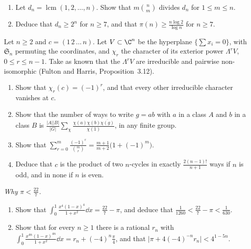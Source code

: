 \begin{exercise}[$\star\star$]\label{pb:nair}
\begin{enumerate}[label=(\alph*)]
\item Let $d_n=\operatorname{lcm}(1,2,\dots,n)$. Show that $m\binom nm$ divides $d_n$ for $1\le m\le n$.
\item Deduce that $d_n\ge2^n$ for $n\ge7$, and that $\pi(n)\ge\frac{n\log2}{\log n}$ for $n\ge7$.
\end{enumerate}
\end{exercise}

\begin{exercise}[$\star\star\star$]\label{pb:ncycles}
Let $n\ge2$ and $c=(1\,2\,\dots\,n)$. Let $V\subset\C^n$ be the hyperplane $\{\sum x_i=0\}$, with $\mathfrak S_n$ permuting
the coordinates, and $\chi_r$ the character of its exterior power $\Lambda^rV$, $0\le r\le n-1$. Take as known that the
$\Lambda^rV$ are irreducible and pairwise non-isomorphic (Fulton and Harris, Proposition~3.12).
\begin{enumerate}[label=(\alph*)]
\item Show that $\chi_r(c)=(-1)^r$, and that every other irreducible character vanishes at $c$.
\item Show that the number of ways to write $g=ab$ with $a$ in a class $A$ and $b$ in a class $B$ is
$\frac{|A||B|}{|G|}\sum_\chi\frac{\chi(a)\chi(b)\overline{\chi(g)}}{\chi(1)}$, in any finite group.
\item Show that $\sum_{r=0}^m\frac{(-1)^r}{\binom mr}=\frac{m+1}{m+2}\bigl(1+(-1)^m\bigr)$.
\item Deduce that $c$ is the product of two $n$-cycles in exactly $\frac{2(n-1)!}{n+1}$ ways if $n$ is odd, and in none if $n$ is
even.
\end{enumerate}
\end{exercise}

\begin{exercise}[$\star$]\label{pb:dalzell}
\emph{Why $\pi<\frac{22}7$.}
\begin{enumerate}[label=(\alph*)]
\item Show that $\displaystyle\int_0^1\frac{x^4(1-x)^4}{1+x^2}\dd x=\frac{22}7-\pi$, and deduce that $\frac1{1260}<\frac{22}7-\pi<\frac1{630}$.
\item Show that for every $n\ge1$ there is a rational $r_n$ with $\displaystyle\int_0^1\frac{x^{4n}(1-x)^{4n}}{1+x^2}\dd x=r_n+(-4)^n\frac\pi4$, and that
$\bigl|\pi+4(-4)^{-n}r_n\bigr|<4^{1-5n}$.
\end{enumerate}
\end{exercise}

